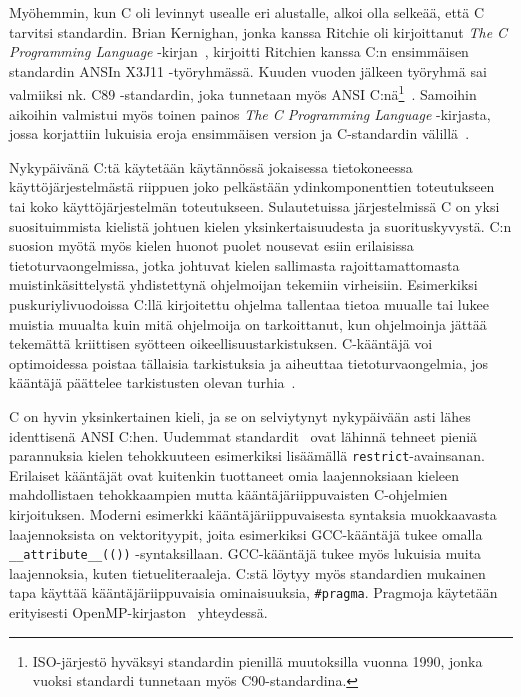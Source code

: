 Myöhemmin, kun C oli levinnyt usealle eri alustalle, alkoi olla selkeää, että C
tarvitsi standardin. Brian Kernighan, jonka kanssa Ritchie oli kirjoittanut
\emph{The C Programming Language} -kirjan~\citep{krfirst}, kirjoitti Ritchien
kanssa C:n ensimmäisen standardin ANSIn X3J11 -työryhmässä. Kuuden vuoden
jälkeen työryhmä sai valmiiksi nk. C89 -standardin, joka tunnetaan myös ANSI
C:nä\footnote{ISO-järjestö hyväksyi standardin pienillä muutoksilla vuonna
1990, jonka vuoksi standardi tunnetaan myös C90-standardina.}~\citep{C89}.
Samoihin aikoihin valmistui myös toinen painos \emph{The C Programming
Language} -kirjasta, jossa korjattiin lukuisia eroja ensimmäisen version ja
C-standardin välillä~\citep{krsecond}.

\grayrule

Nykypäivänä C:tä käytetään käytännössä jokaisessa tietokoneessa
käyttöjärjestelmästä riippuen joko pelkästään ydinkomponenttien toteutukseen
tai koko käyttöjärjestelmän toteutukseen. Sulautetuissa järjestelmissä C on
yksi suosituimmista kielistä johtuen kielen yksinkertaisuudesta ja
suorituskyvystä. C:n suosion myötä myös kielen huonot puolet nousevat esiin
erilaisissa tietoturvaongelmissa, jotka johtuvat kielen sallimasta
rajoittamattomasta muistinkäsittelystä yhdistettynä ohjelmoijan tekemiin
virheisiin. Esimerkiksi puskuriylivuodoissa C:llä kirjoitettu ohjelma tallentaa
tietoa muualle tai lukee muistia muualta kuin mitä ohjelmoija on tarkoittanut,
kun ohjelmoinja jättää tekemättä kriittisen syötteen oikeellisuustarkistuksen.
C-kääntäjä voi optimoidessa poistaa tällaisia tarkistuksia ja aiheuttaa
tietoturvaongelmia, jos kääntäjä päättelee tarkistusten olevan
turhia~\citep{redhatsecurity}.

C on hyvin yksinkertainen kieli, ja se on selviytynyt nykypäivään asti lähes
identtisenä ANSI C:hen. Uudemmat standardit~\citep{C99, C11, C18} ovat lähinnä
tehneet pieniä parannuksia kielen tehokkuuteen esimerkiksi lisäämällä
\texttt{restrict}-avainsanan. Erilaiset kääntäjät ovat kuitenkin tuottaneet
omia laajennoksiaan kieleen mahdollistaen tehokkaampien mutta
kääntäjäriippuvaisten C-ohjelmien kirjoituksen. Moderni esimerkki
kääntäjäriippuvaisesta syntaksia muokkaavasta laajennoksista on vektorityypit,
joita esimerkiksi GCC-kääntäjä tukee omalla \texttt{\_\_attribute\_\_(())}
-syntaksillaan. GCC-kääntäjä tukee myös lukuisia muita laajennoksia, kuten
tietueliteraaleja. C:stä löytyy myös standardien mukainen tapa käyttää
kääntäjäriippuvaisia ominaisuuksia, \texttt{\#pragma}. Pragmoja käytetään
erityisesti OpenMP-kirjaston~\citep{openmp} yhteydessä.

